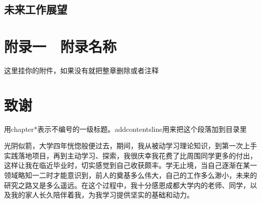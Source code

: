 \documentclass[UTF8,twoside]{ctexrep}
\begin{document}
\section{未来工作展望}






\chapter*{附录一　附录名称}

这里挂你的附件，如果没有就把整章删除或者注释

\chapter*{致谢}

用chapter*表示不编号的一级标题。addcontentsline用来把这个段落加到目录里

光阴似箭，大学四年恍惚般便过去，期间，我从被动学习理论知识，到第一次上手实践落地项目，再到主动学习、探索，我很庆幸我花费了比周围同学更多的付出，这样让我在临近毕业时，切实感觉到自己收获颇丰。学无止境，当自己逐渐在某一领域略知一二时才能意识到，前人的奠基多么伟大，自己的工作多么渺小，未来的研究之路又是多么遥远。在这个过程中，我十分感恩成都大学内的老师、同学，以及我的家人长久陪伴着我，为我学习提供坚实的基础和动力。
\end{document}
